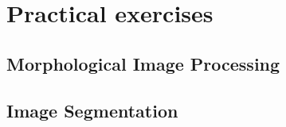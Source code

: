 \section{Practical exercises}
\subsection{Morphological Image Processing}


\subsection{Image Segmentation}
